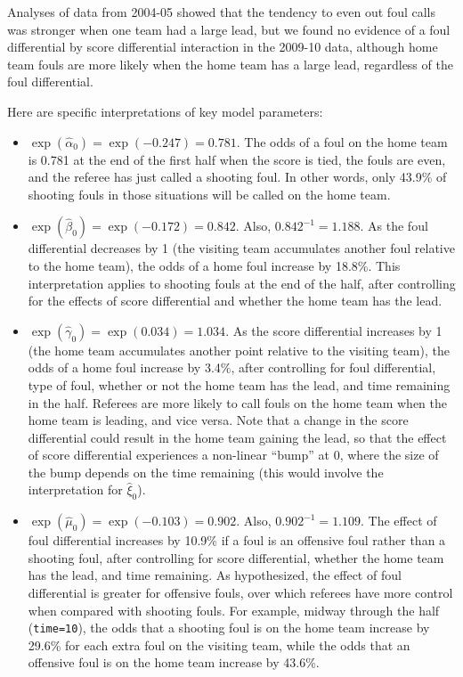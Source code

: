 \documentclass[
]{krantz}
\providecommand{\tightlist}{%
  \setlength{\itemsep}{0pt}\setlength{\parskip}{0pt}}
\begin{document}
Analyses of data from 2004-05 \citep{Noecker2012} showed that the tendency to even out foul calls was stronger when one team had a large lead, but we found no evidence of a foul differential by score differential interaction in the 2009-10 data, although home team fouls are more likely when the home team has a large lead, regardless of the foul differential.

Here are specific interpretations of key model parameters:

\begin{itemize}
\tightlist
\item
  \(\exp(\hat{\alpha}_{0})=\exp(-0.247)=0.781\). The odds of a foul on the home team is 0.781 at the end of the first half when the score is tied, the fouls are even, and the referee has just called a shooting foul. In other words, only 43.9\% of shooting fouls in those situations will be called on the home team.
\item
  \(\exp(\hat{\beta}_{0})=\exp(-0.172)=0.842\). Also, \(0.842^{-1}=1.188\). As the foul differential decreases by 1 (the visiting team accumulates another foul relative to the home team), the odds of a home foul increase by 18.8\%. This interpretation applies to shooting fouls at the end of the half, after controlling for the effects of score differential and whether the home team has the lead.
\item
  \(\exp(\hat{\gamma}_{0})=\exp(0.034)=1.034\). As the score differential increases by 1 (the home team accumulates another point relative to the visiting team), the odds of a home foul increase by 3.4\%, after controlling for foul differential, type of foul, whether or not the home team has the lead, and time remaining in the half. Referees are more likely to call fouls on the home team when the home team is leading, and vice versa. Note that a change in the score differential could result in the home team gaining the lead, so that the effect of score differential experiences a non-linear ``bump'' at 0, where the size of the bump depends on the time remaining (this would involve the interpretation for \(\hat{\xi}_{0}\)).
\item
  \(\exp(\hat{\mu}_{0})=\exp(-0.103)=0.902\). Also, \(0.902^{-1}=1.109\). The effect of foul differential increases by 10.9\% if a foul is an offensive foul rather than a shooting foul, after controlling for score differential, whether the home team has the lead, and time remaining. As hypothesized, the effect of foul differential is greater for offensive fouls, over which referees have more control when compared with shooting fouls. For example, midway through the half (\texttt{time=10}), the odds that a shooting foul is on the home team increase by 29.6\% for each extra foul on the visiting team, while the odds that an offensive foul is on the home team increase by 43.6\%.

\end{itemize}
\end{document}
